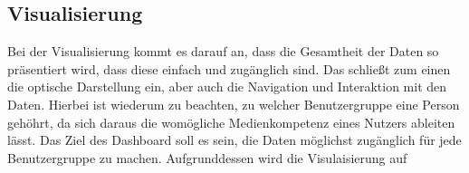 \subsection{Visualisierung}
Bei der Visualisierung kommt es darauf an, dass die Gesamtheit der Daten so präsentiert wird, dass diese einfach und zugänglich sind. Das schließt zum einen die optische Darstellung ein, aber auch die Navigation und Interaktion mit den Daten. Hierbei ist wiederum zu beachten, zu welcher Benutzergruppe eine Person gehöhrt, da sich daraus die womögliche Medienkompetenz eines Nutzers ableiten lässt. \cite{few_2013}
Das Ziel des Dashboard soll es sein, die Daten möglichst zugänglich für jede Benutzergruppe zu machen. Aufgrunddessen wird die Visulaisierung auf 